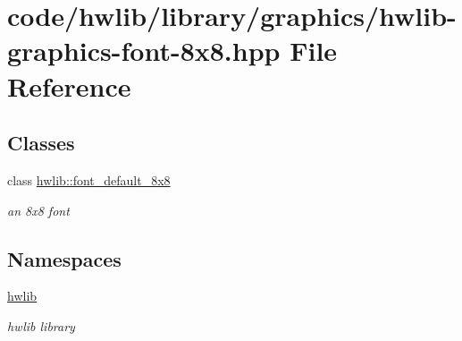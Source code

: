 \hypertarget{hwlib-graphics-font-8x8_8hpp}{}\section{code/hwlib/library/graphics/hwlib-\/graphics-\/font-\/8x8.hpp File Reference}
\label{hwlib-graphics-font-8x8_8hpp}
\subsection*{Classes}
\begin{DoxyCompactItemize}
\item 
class \hyperlink{classhwlib_1_1font__default__8x8}{hwlib\+::font\+\_\+default\+\_\+8x8}
\begin{DoxyCompactList}\small\item\em an 8x8 font \end{DoxyCompactList}\end{DoxyCompactItemize}
\subsection*{Namespaces}
\begin{DoxyCompactItemize}
\item 
 \hyperlink{namespacehwlib}{hwlib}
\begin{DoxyCompactList}\small\item\em hwlib library \end{DoxyCompactList}\end{DoxyCompactItemize}
